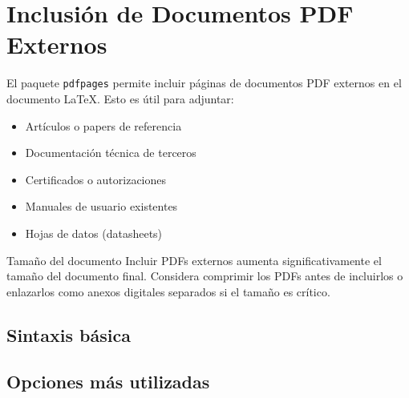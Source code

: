 \section{Inclusión de Documentos PDF Externos}
\label{sec:inclusion-pdf}

El paquete \texttt{pdfpages} permite incluir páginas de documentos PDF externos
en el documento \LaTeX. Esto es útil para adjuntar:
\begin{itemize}
  \item Artículos o papers de referencia
  \item Documentación técnica de terceros
  \item Certificados o autorizaciones
  \item Manuales de usuario existentes
  \item Hojas de datos (datasheets)
\end{itemize}

\begin{warningbox}{Tamaño del documento}
  Incluir PDFs externos aumenta significativamente el tamaño del documento
  final. Considera comprimir los PDFs antes de incluirlos o enlazarlos
  como anexos digitales separados si el tamaño es crítico.
\end{warningbox}

\subsection{Sintaxis básica}
\label{subsec:sintaxis-includepdf}

\begin{latexcode}[title={Inclusión de PDF externo}]





\end{latexcode}

\subsection{Opciones más utilizadas}
\label{subsec:opciones-includepdf}

